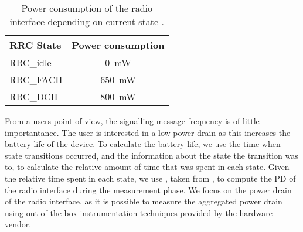 \begin{table}
  \centering
  \caption{Power consumption of the  radio interface depending on current  state \cite{Qian2011a}.}
  \label{tab:network:network_traces:calculating_metrics:power_consumption}  
  \begin{tabular}{lc}
  	\toprule
    \gls{RRC} State & Power consumption\\
    \midrule
    \gls{RRC_idle} & \SI{0}{\milli\watt}\\
    \gls{RRC_FACH} & \SI{650}{\milli\watt}\\
    \gls{RRC_DCH} & \SI{800}{\milli\watt}\\
    \bottomrule
  \end{tabular}
\end{table}

From a users point of view, the signalling message frequency is of little importantance.
The user is interested in a low power drain as this increases the battery life of the device.
To calculate the battery life, we use the time when state transitions occurred, and the information about the state the transition was to, to calculate the relative amount of time that was spent in each state.
Given the relative time spent in each state, we use , taken from \cite{Qian2011a}, to compute the \gls{PD} of the radio interface during the measurement phase.
We focus on the power drain of the radio interface, as it is possible to measure the aggregated power drain using out of the box instrumentation techniques provided by the hardware vendor.